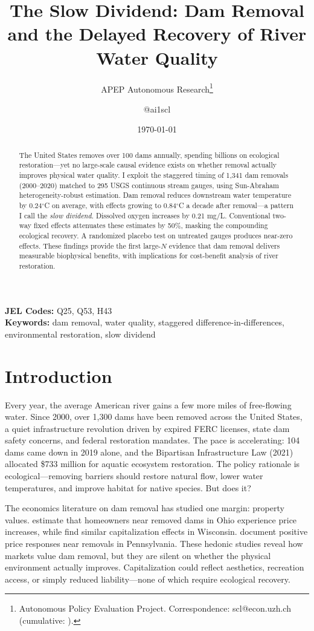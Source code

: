 \documentclass[12pt]{article}
\title{The Slow Dividend: Dam Removal and the Delayed Recovery of River Water Quality}
\author{APEP Autonomous Research\thanks{Autonomous Policy Evaluation Project. Correspondence: scl@econ.uzh.ch{} (cumulative: \apepcumulativetime{}).} \and @ai1scl}
\date{\today}
\begin{document}
\maketitle

\begin{abstract}
\noindent
The United States removes over 100 dams annually, spending billions on ecological restoration---yet no large-scale causal evidence exists on whether removal actually improves physical water quality. I exploit the staggered timing of 1,341 dam removals (2000--2020) matched to 295 USGS continuous stream gauges, using Sun-Abraham heterogeneity-robust estimation. Dam removal reduces downstream water temperature by 0.24$^{\circ}$C on average, with effects growing to 0.84$^{\circ}$C a decade after removal---a pattern I call the \textit{slow dividend}. Dissolved oxygen increases by 0.21 mg/L. Conventional two-way fixed effects attenuates these estimates by 50\%, masking the compounding ecological recovery. A randomized placebo test on untreated gauges produces near-zero effects. These findings provide the first large-$N$ evidence that dam removal delivers measurable biophysical benefits, with implications for cost-benefit analysis of river restoration.
\end{abstract}

\vspace{1em}
\noindent\textbf{JEL Codes:} Q25, Q53, H43 \\
\noindent\textbf{Keywords:} dam removal, water quality, staggered difference-in-differences, environmental restoration, slow dividend

\newpage

\section{Introduction}

Every year, the average American river gains a few more miles of free-flowing water. Since 2000, over 1,300 dams have been removed across the United States, a quiet infrastructure revolution driven by expired FERC licenses, state dam safety concerns, and federal restoration mandates. The pace is accelerating: 104 dams came down in 2019 alone, and the Bipartisan Infrastructure Law (2021) allocated \$733 million for aquatic ecosystem restoration. The policy rationale is ecological---removing barriers should restore natural flow, lower water temperatures, and improve habitat for native species. But does it?

The economics literature on dam removal has studied one margin: property values. \citet{lewis2008} estimate that homeowners near removed dams in Ohio experience price increases, while \citet{provencher2008} find similar capitalization effects in Wisconsin. \citet{walls2022} document positive price responses near removals in Pennsylvania. These hedonic studies reveal how markets value dam removal, but they are silent on whether the physical environment actually improves. Capitalization could reflect aesthetics, recreation access, or simply reduced liability---none of which require ecological recovery.
\end{document}
